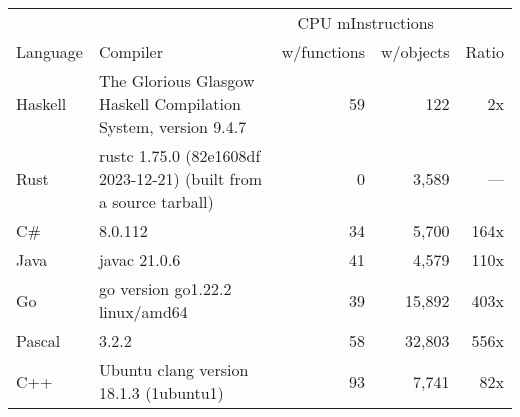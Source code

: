 \documentclass{article}
\begin{document}
      \begin{tabularx}{\linewidth}{lXrrr}
      \toprule
        & & \multicolumn{2}{c}{CPU mInstructions} & \\
        Language & Compiler & w/functions & w/objects & Ratio \\
      \midrule
    Haskell & The Glorious Glasgow Haskell Compilation System, version 9.4.7 & 59 & 122 & 2x \\
Rust & rustc 1.75.0 (82e1608df 2023-12-21) (built from a source tarball) & 0 & 3,589 & --- \\
C\# & 8.0.112 & 34 & 5,700 & 164x \\
Java & javac 21.0.6 & 41 & 4,579 & 110x \\
Go & go version go1.22.2 linux/amd64 & 39 & 15,892 & 403x \\
Pascal & 3.2.2 & 58 & 32,803 & 556x \\
C++ & Ubuntu clang version 18.1.3 (1ubuntu1) & 93 & 7,741 & 82x \\

      \bottomrule
      \end{tabularx}
      
\end{document}
